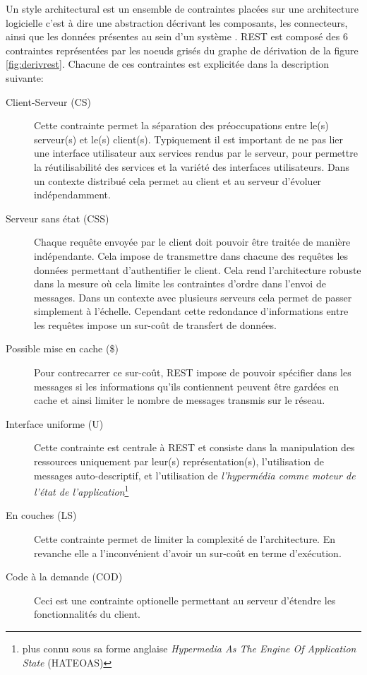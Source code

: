 \documentclass[a4paper, 11pt]{report}
\begin{document}
Un style architectural est un ensemble de contraintes placées sur une
architecture logicielle c'est à dire une abstraction décrivant les
composants, les connecteurs, ainsi que les données présentes au sein
d'un système \cite{perry1992foundations}. REST est composé des 6
contraintes représentées par les noeuds grisés du graphe de dérivation
de la figure \ref{fig:derivrest}. Chacune de ces contraintes est
explicitée dans la description suivante:

\begin{description}
\item[Client-Serveur (CS)] Cette contrainte permet la séparation des
  préoccupations entre le(s) serveur(s) et le(s) client(s).
  Typiquement il est important de ne pas lier une interface
  utilisateur aux services rendus par le serveur, pour permettre la
  réutilisabilité des services et la variété des interfaces
  utilisateurs. Dans un contexte distribué cela permet au client et
  au serveur d'évoluer indépendamment.

\item[Serveur sans état (CSS)] Chaque requête envoyée par le client
  doit pouvoir être traitée de manière indépendante. Cela impose de
  transmettre dans chacune des requêtes les données permettant
  d'authentifier le client. Cela rend l'architecture robuste dans la
  mesure où cela limite les contraintes d'ordre dans l'envoi de
  messages. Dans un contexte avec plusieurs serveurs cela permet de
  passer simplement à l'échelle. Cependant cette redondance
  d'informations entre les requêtes impose un sur-coût de transfert de
  données.

\item [Possible mise en cache (\$)] Pour contrecarrer ce sur-coût,
  REST impose de pouvoir spécifier dans les messages si les
  informations qu'ils contiennent peuvent être gardées en cache et
  ainsi limiter le nombre de messages transmis sur le réseau.

\item[Interface uniforme (U)] Cette contrainte est centrale à REST et
  consiste dans la manipulation des ressources uniquement par leur(s)
  représentation(s), l'utilisation de messages auto-descriptif, et
  l'utilisation de \emph{l'hypermédia comme moteur de l'état de
    l'application}\footnote{plus connu sous sa forme anglaise
    \emph{Hypermedia As The Engine Of Application State} (HATEOAS)}

\item[En couches (LS)] Cette contrainte permet de limiter la
  complexité de l'architecture. En revanche elle a l'inconvénient
  d'avoir un sur-coût en terme d'exécution.

\item[Code à la demande (COD)] Ceci est une contrainte optionelle
  permettant au serveur d'étendre les fonctionnalités du client.
\end{description}
\end{document}
